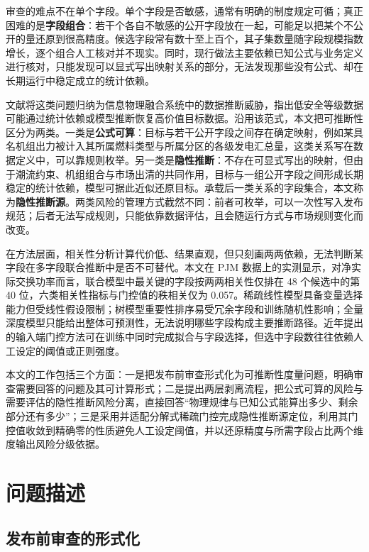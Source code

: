 \documentclass[UTF8,zihao=5,twoside]{ctexart}
\begin{document}
审查的难点不在单个字段。单个字段是否敏感，通常有明确的制度规定可循；真正困难的是\textbf{字段组合}：若干个各自不敏感的公开字段放在一起，可能足以把某个不公开的量还原到很高精度。候选字段常有数十至上百个，其子集数量随字段规模指数增长，逐个组合人工核对并不现实。同时，现行做法主要依赖已知公式与业务定义进行核对，只能发现可以显式写出映射关系的部分，无法发现那些没有公式、却在长期运行中稳定成立的统计依赖。

文献\cite{ref-liu-data-inference}将这类问题归纳为信息物理融合系统中的数据推断威胁，指出低安全等级数据可能通过统计依赖或模型推断恢复高价值目标数据。沿用该范式，本文把可推断性区分为两类。一类是\textbf{公式可算}：目标与若干公开字段之间存在确定映射，例如某具名机组出力被计入其所属燃料类型与所属分区的各级发电汇总量，这类关系写在数据定义中，可以靠规则枚举。另一类是\textbf{隐性推断}：不存在可显式写出的映射，但由于潮流约束、机组组合与市场出清的共同作用，目标与一组公开字段之间形成长期稳定的统计依赖，模型可据此近似还原目标。承载后一类关系的字段集合，本文称为\textbf{隐性推断源}。两类风险的管理方式截然不同：前者可枚举，可以一次性写入发布规范；后者无法写成规则，只能依靠数据评估，且会随运行方式与市场规则变化而改变。

在方法层面，相关性分析\cite{ref-lan-load,ref-szekely-dcorr}计算代价低、结果直观，但只刻画两两依赖，无法判断某字段在多字段联合推断中是否不可替代。本文在 PJM 数据上的实测显示，对净实际交换功率而言，联合模型中最关键的字段按两两相关性仅排在 48 个候选中的第 40 位，六类相关性指标与门控值的秩相关仅为 0.057。稀疏线性模型\cite{ref-tibshirani-lasso}具备变量选择能力但受线性假设限制；树模型重要性排序易受冗余字段和训练随机性影响\cite{ref-chen-xgboost}；全量深度模型只能给出整体可预测性，无法说明哪些字段构成主要推断路径。近年提出的输入端门控方法\cite{ref-yamada-stg,ref-lemhadri-lassonet}可在训练中同时完成拟合与字段选择，但选中字段数往往依赖人工设定的阈值或正则强度。

本文的工作包括三个方面：一是把发布前审查形式化为可推断性度量问题，明确审查需要回答的问题及其可计算形式；二是提出两层剥离流程，把公式可算的风险与需要评估的隐性推断风险分离，直接回答“物理规律与已知公式能算出多少、剩余部分还有多少”；三是采用并适配分解式稀疏门控完成隐性推断源定位，利用其门控值收敛到精确零的性质避免人工设定阈值，并以还原精度与所需字段占比两个维度输出风险分级依据。

\section{问题描述}

\subsection{发布前审查的形式化}
\end{document}
